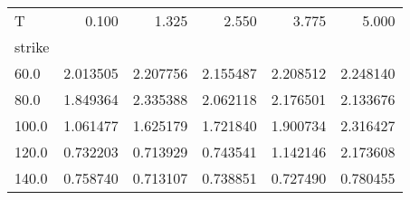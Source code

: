 \begin{tabular}{lrrrrr}
\toprule
T &     0.100 &     1.325 &     2.550 &     3.775 &     5.000 \\
strike &           &           &           &           &           \\
\midrule
60.0   &  2.013505 &  2.207756 &  2.155487 &  2.208512 &  2.248140 \\
80.0   &  1.849364 &  2.335388 &  2.062118 &  2.176501 &  2.133676 \\
100.0  &  1.061477 &  1.625179 &  1.721840 &  1.900734 &  2.316427 \\
120.0  &  0.732203 &  0.713929 &  0.743541 &  1.142146 &  2.173608 \\
140.0  &  0.758740 &  0.713107 &  0.738851 &  0.727490 &  0.780455 \\
\bottomrule
\end{tabular}
